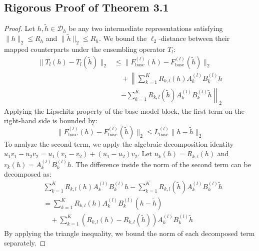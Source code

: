 \subsection{Rigorous Proof of Theorem 3.1}
\begin{proof}
Let $h, \tilde{h} \in \mathcal{D}_h$ be any two intermediate representations satisfying $\|h\|_2 \le R_h$ and $\|\tilde{h}\|_2 \le R_h$. We bound the $\ell_2$-distance between their mapped counterparts under the ensembling operator $T_l$:
\begin{equation}
\label{eq:diff_start}
\begin{split}
\|T_l(h) - T_l(\tilde{h})\|_2 & \le \|F_{\text{base}}^{(l)}(h) - F_{\text{base}}^{(l)}(\tilde{h})\|_2 \\
& \quad + \left\| \sum_{k=1}^K R_{k, l}(h) A_k^{(l)} B_k^{(l)} h \right. \\
& \quad \left. - \sum_{k=1}^K R_{k, l}(\tilde{h}) A_k^{(l)} B_k^{(l)} \tilde{h} \right\|_2
\end{split}
\end{equation}
Applying the Lipschitz property of the base model block, the first term on the right-hand side is bounded by:
\begin{equation}
\label{eq:base_bound}
\|F_{\text{base}}^{(l)}(h) - F_{\text{base}}^{(l)}(\tilde{h})\|_2 \le L_{\text{base}}^{(l)} \|h - \tilde{h}\|_2
\end{equation}
To analyze the second term, we apply the algebraic decomposition identity $u_1 v_1 - u_2 v_2 = u_1 (v_1 - v_2) + (u_1 - u_2) v_2$. Let $u_{k}(h) = R_{k, l}(h)$ and $v_{k}(h) = A_k^{(l)} B_k^{(l)} h$. The difference inside the norm of the second term can be decomposed as:
\begin{align}
\label{eq:decomp}
& \sum_{k=1}^K R_{k, l}(h) A_k^{(l)} B_k^{(l)} h - \sum_{k=1}^K R_{k, l}(\tilde{h}) A_k^{(l)} B_k^{(l)} \tilde{h} \nonumber \\
& = \sum_{k=1}^K R_{k, l}(h) A_k^{(l)} B_k^{(l)} (h - \tilde{h}) \nonumber \\
& \quad + \sum_{k=1}^K \left( R_{k, l}(h) - R_{k, l}(\tilde{h}) \right) A_k^{(l)} B_k^{(l)} \tilde{h}
\end{align}
By applying the triangle inequality, we bound the norm of each decomposed term separately.


\end{proof}
